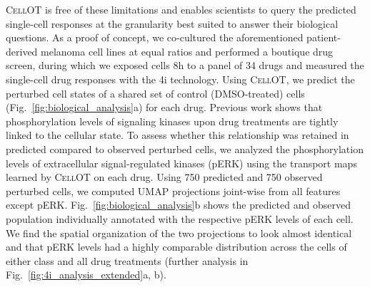 \textsc{CellOT} is free of these limitations and enables scientists to query the predicted single-cell responses at the granularity best suited to answer their biological questions. As a proof of concept, we co-cultured the aforementioned patient-derived melanoma cell lines at equal ratios and performed a boutique drug screen, during which we exposed cells 8h to a panel of 34 drugs and measured the single-cell drug responses with the 4i technology. 
Using \textsc{CellOT}, 
we predict the perturbed cell states of a shared set of control (DMSO-treated) cells (Fig.~\ref{fig:biological_analysis}a) for each drug.
Previous work \citep{kramer2019cellular} shows that phosphorylation levels of signaling kinases upon drug treatments are tightly linked to the cellular state. 
To assess whether this relationship was retained in predicted compared to observed perturbed cells, we analyzed the phosphorylation levels of extracellular signal-regulated kinases (pERK) using the transport maps learned by \textsc{CellOT} on each drug.
Using 750 predicted and 750 observed perturbed cells, we computed UMAP projections joint-wise from all features except pERK. Fig.~\ref{fig:biological_analysis}b shows the predicted and observed population individually annotated with the respective pERK levels of each cell. We find the spatial organization of the two projections to look almost identical and that pERK levels had a highly comparable distribution across the cells of either class and all drug treatments (further analysis in Fig.~\ref{fig:4i_analysis_extended}a, b).


